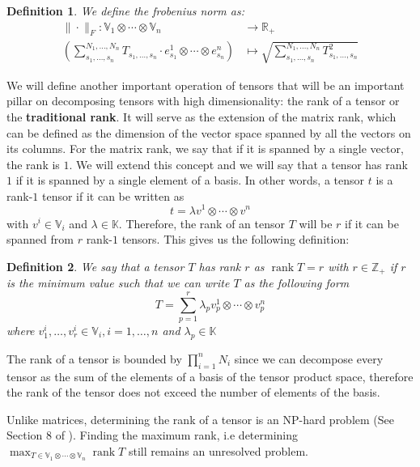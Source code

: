 \documentclass[11pt,a4paper,openright,oneside]{book}
\numberwithin{equation}{section}
\newtheorem{defn0}{Definition}[chapter]
\newenvironment{definition}{ \begin{defn0}}{\end{defn0}}
\DeclareMathOperator{\rank}{rank}
\begin{document}
\begin{definition}
    We define the frobenius norm as:
    $$\begin{align}
        \| \cdot \|_F : \mathbb{V}_1 \otimes \cdots \otimes \mathbb{V}_n & \longrightarrow \mathbb{R}_+ \\
        \left( \sum_{s_1, \dots, s_n}^{N_1, \dots, N_n} T_{s_1, \dots, s_n} \cdot e_{s_1}^1 \otimes \cdots \otimes e_{s_n}^n \right) & \longmapsto 
        \sqrt{\sum_{s_1, \dots, s_n}^{N_1, \dots, N_n} T_{s_1, \dots, s_n}^2}
    \end{align}$$
\end{definition}

We will define another important operation of tensors that will be an important pillar on decomposing tensors with high
dimensionality: the rank of a tensor or the \textbf{traditional rank}. It will serve as the extension of the
matrix rank, which can be defined as the dimension of the vector space spanned by all the vectors
on its columns. For the matrix rank, we say that if it is spanned by a single vector, the rank is $1$. We
will extend this concept and we will say that a tensor has rank $1$ if it is spanned by a single
element of a basis. In other words, a tensor $t$ is a rank-$1$ tensor if it can be written as $$t = \lambda v^1 \otimes \cdots \otimes v^n$$
with $v^i \in \mathbb{V}_i$ and $\lambda \in \mathbb{K}$. Therefore, the rank of an tensor $T$ will be $r$ if it can be spanned from $r$ rank-$1$ tensors.
This gives us the following definition:

\begin{definition}
    We say that a tensor $T$ has rank $r$ as $\rank{T} = r$ with 
    $r \in \mathbb{Z}_+$ if $r$ is the minimum value such that we can write $T$ as the following form
    \begin{equation}
        T= \sum_{p=1}^r \lambda_p v_p^1 \otimes \cdots \otimes v_p^n
        \label{eq:rank}
    \end{equation}
    where $v_1^i, \dots, v_r^i \in \mathbb{V}_i, i = 1, \dots, n$ and $\lambda_p \in \mathbb{K}$
\end{definition}

The rank of a tensor is bounded by $\prod_{i=1}^n N_i$ since we can decompose every tensor as the sum
of the elements of a basis of the tensor product space, therefore the rank of the tensor does not exceed the number
of elements of the basis.

Unlike matrices, determining the rank of a tensor is an NP-hard problem (See Section 8 of \cite{hillarMostTensorProblems2013}).
Finding the maximum rank, i.e determining $\displaystyle\max_{T \in \mathbb{V}_1 \otimes \cdots \otimes \mathbb{V}_n} \rank{T}$ still remains an unresolved problem.
\cite{christandlTensorRankNot2018}
\end{document}
